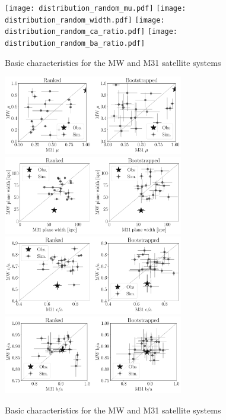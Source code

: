 \documentclass[a4paper,fleqn,usenatbib]{mnras}
\begin{document}
\begin{figure}
\centering
\texttt{[image: distribution\_random\_mu.pdf]}
\texttt{[image: distribution\_random\_width.pdf]}
\texttt{[image: distribution\_random\_ca\_ratio.pdf]}
\texttt{[image: distribution\_random\_ba\_ratio.pdf]}
\caption{Basic characteristics for the MW and M31 satellite systems
\label{fig:lg_distribution}}
\end{figure}


\begin{figure}
\centering
\includegraphics[width=0.7\textwidth]{scatter_mu.pdf}
\includegraphics[width=0.7\textwidth]{scatter_width.pdf}
\includegraphics[width=0.7\textwidth]{scatter_ca_ratio.pdf}
\includegraphics[width=0.7\textwidth]{scatter_ba_ratio.pdf}
\caption{Basic characteristics for the MW and M31 satellite systems
\label{fig:general}}
\end{figure}
\end{document}
